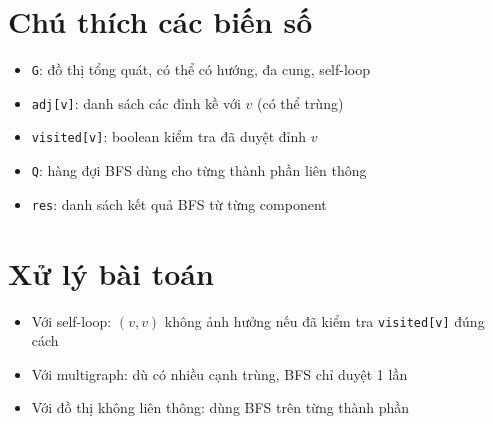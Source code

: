 \documentclass[12pt]{article}
\begin{document}
\section*{Chú thích các biến số}
\begin{itemize}
    \item \texttt{G}: đồ thị tổng quát, có thể có hướng, đa cung, self-loop
    \item \texttt{adj[v]}: danh sách các đỉnh kề với $v$ (có thể trùng)
    \item \texttt{visited[v]}: boolean kiểm tra đã duyệt đỉnh $v$
    \item \texttt{Q}: hàng đợi BFS dùng cho từng thành phần liên thông
    \item \texttt{res}: danh sách kết quả BFS từ từng component
\end{itemize}

\section*{Xử lý bài toán}
\begin{itemize}
    \item Với self-loop: $(v,v)$ không ảnh hưởng nếu đã kiểm tra \texttt{visited[v]} đúng cách
    \item Với multigraph: dù có nhiều cạnh trùng, BFS chỉ duyệt 1 lần
    \item Với đồ thị không liên thông: dùng BFS trên từng thành phần
\end{itemize}
\end{document}
